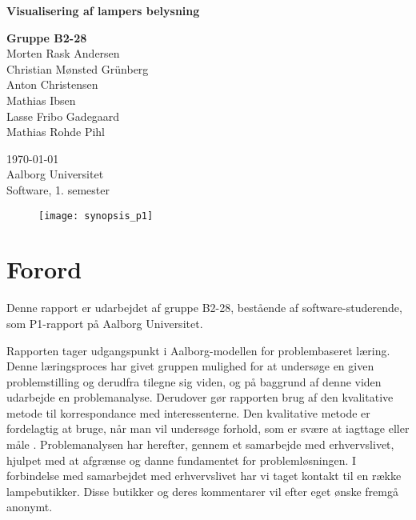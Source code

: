 \begin{titlepage}
  \vspace{0.2cm}
  \begin{center}
    \Huge{\textbf{Visualisering af lampers belysning}}
  \end{center}
  \vspace{0.2cm}
  \begin{center}
    \Large{\textbf{Gruppe B2-28}}\\
	Morten Rask Andersen\\
	Christian Mønsted Grünberg\\
	Anton Christensen\\
	Mathias Ibsen\\
	Lasse Fribo Gadegaard\\
	Mathias Rohde Pihl
  \end{center}
  \vfill
  \begin{center}
 	\today\\
    Aalborg Universitet\\
    Software, 1. semester
  \end{center}
  \begin{figure}[H]
      \texttt{[image: synopsis\_p1]}
  \end{figure}
\end{titlepage}



\addtocounter{page}{-1}
\clearpage



\clearpage


\section{Forord}
Denne rapport er udarbejdet af gruppe B2-28, bestående af software-studerende, som P1-rapport på Aalborg Universitet.

Rapporten tager udgangspunkt i Aalborg-modellen for problembaseret læring. Denne læringsproces har givet gruppen mulighed for at undersøge en given problemstilling og derudfra tilegne sig viden, og på baggrund af denne viden udarbejde en problemanalyse. Derudover gør rapporten brug af den kvalitative metode til korrespondance med interessenterne. Den kvalitative metode er fordelagtig at bruge, når man vil undersøge forhold, som er svære at iagttage eller måle \cite{kvalitativ_metode}. Problemanalysen har herefter, gennem et samarbejde med erhvervslivet, hjulpet med at afgrænse og danne fundamentet for problemløsningen. I forbindelse med samarbejdet med erhvervslivet har vi taget kontakt til en række lampebutikker. Disse butikker og deres kommentarer vil efter eget ønske fremgå anonymt. 

